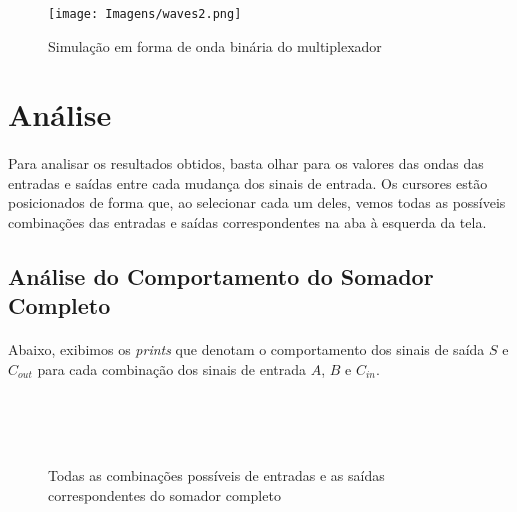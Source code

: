\documentclass[a4paper,12pt]{article}
\begin{document}
\begin{figure}[H]
    \centering
    \begin{tcolorbox}[colframe=darkgray, colback=white, boxrule=0.5pt, arc=1pt, width=0.95\textwidth, center, boxsep=0pt, left=0pt, right=0pt]
    \texttt{[image: Imagens/waves2.png]}
    \end{tcolorbox}
    \caption{Simulação em forma de onda binária do multiplexador}
\end{figure}

\section{Análise}

\paragraph{}
Para analisar os resultados obtidos, basta olhar para os valores das ondas das entradas e saídas entre cada mudança dos sinais de entrada. Os cursores estão posicionados de forma que, ao selecionar cada um deles, vemos todas as possíveis combinações das entradas e saídas correspondentes na aba à esquerda da tela.

\subsection{Análise do Comportamento do Somador Completo}
\paragraph{}
 Abaixo, exibimos os \textit{prints} que denotam o comportamento dos sinais de saída $S$ e $C_{out}$ para cada combinação dos sinais de entrada $A$, $B$ e $C_{in}$.

\setlength{\fboxsep}{0pt} %
\begin{figure}[H]
    \centering
     \\
     \\
     \\
    \caption{Todas as combinações possíveis de entradas e as saídas correspondentes do somador completo}
\end{figure}
\end{document}
